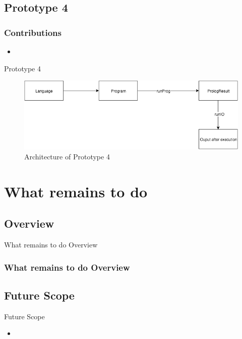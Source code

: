 \documentclass[hideothersubsections, t, aspectratio=1610]{beamer}
\begin{document}
\subsection{Prototype 4}

\begin{frame}
\frametitle{Contributions}
\begin{itemize}
\item
\end{itemize}
\end{frame}


\begin{frame}{Prototype 4}
\begin{figure}[H]
  \includegraphics[width=1\textwidth]{Prototype-4-architecture.jpeg}
  \caption{Architecture of Prototype 4}
  \label{fig:proto1-arch}
\end{figure}
\end{frame}


\section{What remains to do}

\subsection{Overview}
\begin{frame}{What remains to do Overview}
	
	\frametitle{What remains to do Overview}
	
\end{frame}

\subsection{Future Scope}
\begin{frame}{Future Scope}
\begin{itemize}
\item
\end{itemize}

\end{frame}
\end{document}
